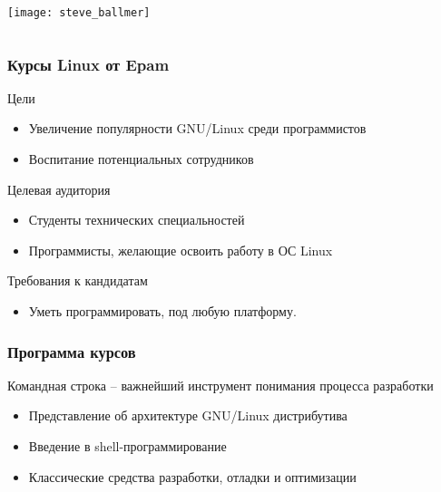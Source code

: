 
\begin{frame}{}
	\begin{columns}
		\Huge
		\center\texttt{[image: steve\_ballmer]}
	\end{columns}
\end{frame}


\begin{frame}
	\frametitle{Курсы Linux от Epam}

	\begin{block}{Цели}
		\begin{itemize}
			\item Увеличение популярности GNU/Linux среди программистов
			\item Воспитание потенциальных сотрудников
		\end{itemize}
	\end{block}

	\pause

	\begin{block}{Целевая аудитория}
		\begin{itemize}
			\item Студенты технических специальностей
			\item Программисты, желающие освоить работу в ОС Linux
		\end{itemize}
	\end{block}

	\begin{block}{Требования к кандидатам}
		\begin{itemize}
			\item Уметь программировать, под любую платформу.
		\end{itemize}
	\end{block}

\end{frame}

\begin{frame}
	\frametitle{Программа курсов}

	\begin{block}{Командная строка -- важнейший инструмент понимания процесса разработки}
		\begin{itemize}
			\item Представление об архитектуре GNU/Linux дистрибутива
			\item Введение в shell-программирование
			\item Классические средства разработки, отладки и оптимизации
		\end{itemize}
	\end{block}
\end{frame}

